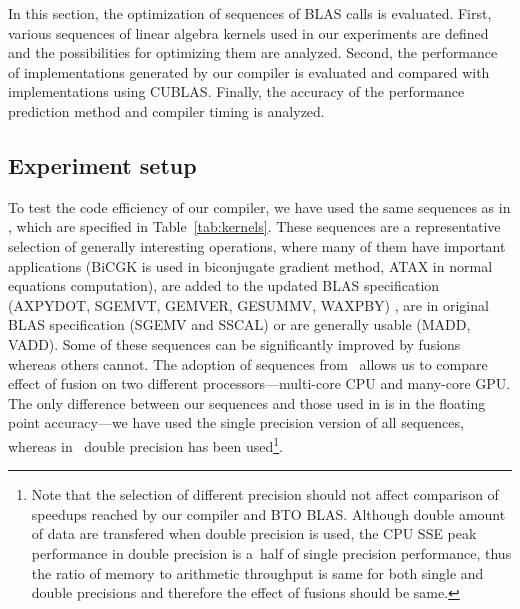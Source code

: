 \documentclass[final]{siamltex}
\begin{document}
{In this section, the optimization of sequences of BLAS calls is evaluated. First, various sequences of linear algebra kernels used in our experiments are defined and the possibilities for optimizing them are analyzed. Second, the performance of implementations generated by our compiler is evaluated and compared with implementations using CUBLAS. Finally, the accuracy of the performance prediction method and compiler timing is analyzed.

\subsection{Experiment setup}


To test the code efficiency of our compiler, we have used the same sequences as in \cite{belter2009automating}, which are specified in Table~\ref{tab:kernels}. These sequences are a representative selection of generally interesting operations, where many of them have important applications (BiCGK is used in biconjugate gradient method, ATAX in normal equations computation), are added to the updated BLAS specification (AXPYDOT, SGEMVT, GEMVER, GESUMMV, WAXPBY) \cite{blackford2002updated}, are in original BLAS specification (SGEMV and SSCAL) or are generally usable (MADD, VADD). Some of these sequences can be significantly improved by fusions whereas others cannot. The adoption of sequences from~\cite{belter2009automating} allows us to compare effect of fusion on two different processors---multi-core CPU and many-core GPU. The only difference between our sequences and those used in \cite{belter2009automating} is in the floating point accuracy---we have used the single precision version of all sequences, whereas in~\cite{belter2009automating} double precision has been used\footnote{Note that the selection of different precision should not affect comparison of speedups reached by our compiler and BTO BLAS. Although double amount of data are transfered when double precision is used, the CPU SSE peak performance in double precision is a~half of single precision performance, thus the ratio of memory to arithmetic throughput is same for both single and double precisions and therefore the effect of fusions should be same.}. 

}
\end{document}
